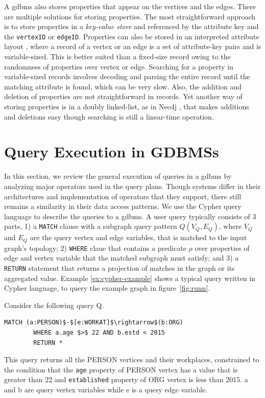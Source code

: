 A \gls{gdbms} also stores properties that appear on the vertices and the edges. There are multiple solutions for storing properties. The most straightforward approach is to store properties in a \emph{key-value store} \cite{dgraph} and referenced by the attribute key and the \texttt{vertexID} or \texttt{edgeID}. Properties can also be stored in an interpreted attribute layout \cite{beckmann:sparse}, where a record of a vertex or an edge is a set of attribute-key pairs and is variable-sized. This is better suited than a fixed-size record owing to the randomness of properties over vertex or edge. Searching for a property in variable-sized records involves decoding and parsing the entire record until the matching attribute is found, which can be very slow. Also, the addition and deletion of properties are not straightforward in records. Yet another way of storing properties is in a doubly linked-list, as in Neo4j \cite{neo4j}, that makes additions and deletions easy though searching is still a linear-time operation.

\section{Query Execution in GDBMSs}
\label{sec:operators}

In this section, we review the general execution of queries in a \gls{gdbms} by analyzing major operators used in the query plans. Though systems differ in their architectures and implementation of operators that they support, there still remains a similarity in their data access patterns. We use the Cypher query language \cite{cypher} to describe the queries to a \gls{gdbms}. A user query typically consists of 3 parts, 1) a \texttt{MATCH} clause with a subgraph query pattern $Q(V_Q, E_Q)$, where $V_Q$ and $E_Q$ are the query vertex and edge variables, that is matched to the input graph's topology; 2) \texttt{WHERE} claue that contains a predicate $\rho$ over properties of edge and vertex variable that the matched subgraph must satisfy; and 3) a \texttt{RETURN} statement that returns a projection of matches in the graph or its aggregated value. Example \ref{ex:cypher-example} shows a typical query written in Cypher language, to query the example graph in figure~\ref{fig:runn}.

\begin{example}
	\label{ex:cypher-example}
	Consider the following query Q. 
	{\em 
		\begin{lstlisting}[numbers=none,  showstringspaces=false,belowskip=0pt ]
		MATCH (a:PERSON)$-$[e:WORKAT]$\rightarrow$(b:ORG)
		WHERE a.age $>$ 22 AND b.estd < 2015
		RETURN *\end{lstlisting}
	}
	This query returns all the PERSON vertices and their workplaces, constrained to the condition that the \textsc{}\texttt{age}\textsc{} property of PERSON vertex has a value that is greater than 22 and \textsc{}\texttt{established}\textsc{} property of ORG vertex is less than 2015. a and b are query vertex variables while e is a query edge variable.
\end{example}
\vspace{-5pt}

